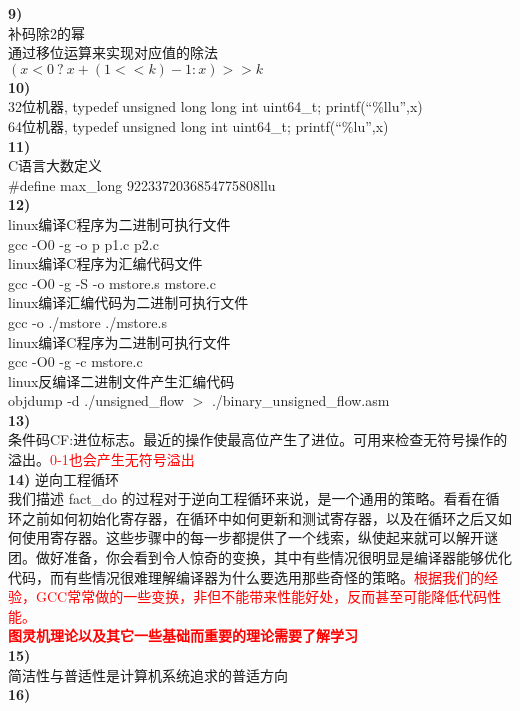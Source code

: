 \documentclass{article}
\newcommand{\red}[1]{\textcolor{red}{#1}}
\begin{document}
\begin{CJK}{UTF8}{uyhei}
\textbf{9)}	\\
补码除2的幂	\\
通过移位运算来实现对应值的除法	\\
$(x<0\ ?\ x+(1<<k)-1 : x) >> k$	\\[1ex]
\textbf{10)}	\\
32位机器, typedef unsigned long long int uint64\_t; printf(``\%llu'',x)	\\
64位机器, typedef unsigned long int uint64\_t; printf(``\%lu'',x)	\\
\textbf{11)}	\\
C语言大数定义	\\
\#define max\_long 9223372036854775808llu	\\
\textbf{12)}	\\
linux编译C程序为二进制可执行文件	\\
gcc -O0 -g -o p p1.c p2.c	\\
linux编译C程序为汇编代码文件	\\
gcc -O0 -g -S -o mstore.s mstore.c	\\
linux编译汇编代码为二进制可执行文件	\\
gcc -o ./mstore ./mstore.s	\\
linux编译C程序为二进制可执行文件	\\
gcc -O0 -g -c mstore.c	\\
linux反编译二进制文件产生汇编代码	\\
objdump -d ./unsigned\_flow $>$ ./binary\_unsigned\_flow.asm	\\
\textbf{13)}	\\
条件码CF:进位标志。最近的操作使最高位产生了进位。可用来检查无符号操作的溢出。\red{0-1也会产生无符号溢出}	\\
\textbf{14)}
逆向工程循环	\\
我们描述 fact\_do 的过程对于逆向工程循环来说，是一个通用的策略。看看在循环之前如何初始化寄存器，在循环中如何更新和测试寄存器，以及在循环之后又如何使用寄存器。这些步骤中的每一步都提供了一个线索，纵使起来就可以解开谜团。做好准备，你会看到令人惊奇的变换，其中有些情况很明显是编译器能够优化代码，而有些情况很难理解编译器为什么要选用那些奇怪的策略。\red{根据我们的经验，GCC常常做的一些变换，非但不能带来性能好处，反而甚至可能降低代码性能。}	\\[2ex]
\textbf{\red{ 图灵机理论以及其它一些基础而重要的理论需要了解学习 }}	\\
\textbf{15)}	\\
简洁性与普适性是计算机系统追求的普适方向	\\
\textbf{16)}	\\

\end{CJK}
\end{document}
